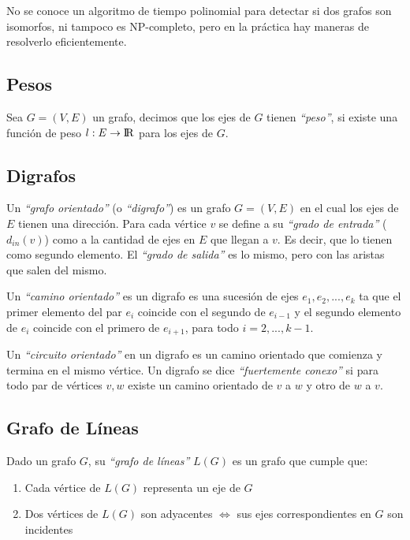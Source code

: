 No se conoce un algoritmo de tiempo polinomial para detectar si dos grafos son isomorfos, ni tampoco es NP-completo, pero en la pr\'actica hay maneras de resolverlo eficientemente.

\subsection{Pesos}

  Sea $G = (V, E)$ un grafo, decimos que los ejes de $G$ tienen \emph{``peso''}, si existe una funci\'on de peso $l: E \rightarrow {\rm I\!R}$ para los ejes de $G$.

\newpage
\subsection{Digrafos}

Un \emph{``grafo orientado''} (o \emph{``digrafo''}) es un grafo $G=(V,E)$ en el cual los ejes de $E$ tienen una direcci\'on. Para cada v\'ertice $v$ se define a su \emph{``grado de entrada''} ($d_{in}(v)$) como a la cantidad de ejes en $E$ que llegan a $v$. Es decir, que lo tienen como segundo elemento. El \emph{``grado de salida''} es lo mismo, pero con las aristas que salen del mismo.

Un \emph{``camino orientado''} es un digrafo es una sucesi\'on de ejes $e_1, e_2, ..., e_k$ ta que el primer elemento del par $e_i$ coincide con el segundo de $e_{i-1}$ y el segundo elemento de $e_i$ coincide con el primero de $e_{i+1}$, para todo $i = 2, ..., k-1$.

Un \emph{``circuito orientado''} en un digrafo es un camino orientado que comienza y termina en el mismo v\'ertice. Un digrafo se dice \emph{``fuertemente conexo''} si para todo par de v\'ertices $v,w$ existe un camino orientado de $v$ a $w$ y otro de $w$ a $v$.

\subsection{Grafo de L\'ineas}

Dado un grafo $G$, su \emph{``grafo de l\'ineas''} $L(G)$ es un grafo que cumple que:

\begin{enumerate}
\item Cada v\'ertice de $L(G)$ representa un eje de $G$
\item Dos v\'ertices de $L(G)$ son adyacentes $\Longleftrightarrow$ sus ejes correspondientes en $G$ son incidentes
\end{enumerate}

